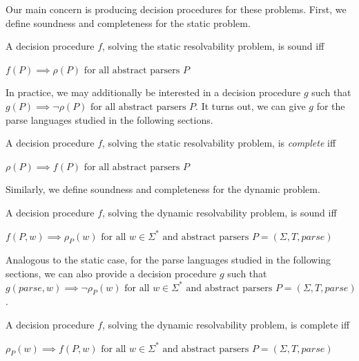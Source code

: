 \documentclass[runningheads]{llncs}
\newcommand{\T}{\Sigma} %
\newcommand{\parse}{\mathit{parse}} %
\begin{document}
\noindent Our main concern is producing decision procedures for these problems. First, we define soundness and completeness for the static problem.

\begin{definition}\label{def:static-procedure-sound}
  A decision procedure $f$, solving the static resolvability problem, is sound iff

  $f(P) \implies \rho(P) \text{ for all abstract parsers } P$
\end{definition}

In practice, we may additionally be interested in a decision procedure
$g$ such that $g(P) \implies \lnot \rho(P) \text{ for all abstract
  parsers } P$. It turns out, we can give $g$ for the parse languages
studied in the following sections.

\begin{definition}\label{def:static-procedure-complete}
  A decision procedure $f$, solving the static resolvability problem, is \emph{complete} iff

  $\rho(P) \implies f(P) \text{ for all abstract parsers } P$
\end{definition}


\noindent Similarly, we define soundness and completeness for the dynamic problem.

\begin{definition}\label{def:dynamic-procedure-sound}
  A decision procedure $f$, solving the dynamic resolvability problem, is sound iff

  $f(P, w) \implies \rho_P(w) \text{ for all } w \in \Sigma^{*} \text{ and abstract parsers } P = (\T, T, \parse)$
\end{definition}

\noindent Analogous to the static case, for the parse languages studied in the
following sections, we can also provide a decision procedure $g$ such
that $g(\parse, w) \implies \lnot \rho_P(w) \text{ for all } w \in
\Sigma^{*} \text{ and abstract parsers } P = (\T, T, \parse)$.

\begin{definition}\label{def:dynamic-procedure-complete}
  A decision procedure $f$, solving the dynamic resolvability problem, is complete iff

  $\rho_P(w) \implies f(P, w) \text{ for all } w \in \Sigma^{*} \text{ and abstract parsers } P = (\T, T, \parse)$
\end{definition}
\end{document}
